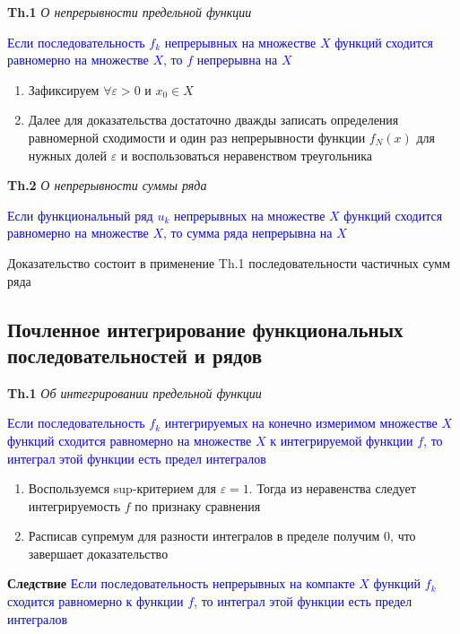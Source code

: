 \textbf{Th.1} \textit{О непрерывности предельной функции}

\textcolor{blue}{Если последовательность $f_k$ непрерывных на множестве $X$ функций сходится равномерно на
множестве $X$, то $f$ непрерывна на $X$}

\begin{enumerate}
    \item Зафиксируем $\forall \varepsilon > 0$ и $x_0 \in X$
    \item Далее для доказательства достаточно дважды записать определения равномерной сходимости и
    один раз непрерывности функции $f_N (x)$ для нужных долей  $\varepsilon$ и воспользоваться неравенством
    треугольника
\end{enumerate}

\textbf{Th.2} \textit{О непрерывности суммы ряда}

\textcolor{blue}{Если функциональный ряд $u_k$ непрерывных на множестве $X$ функций сходится
равномерно на множестве $X$, то сумма ряда непрерывна на $X$}

Доказательство состоит в применение Th.1 последовательности частичных сумм ряда

\subsection{Почленное интегрирование функциональных последовательностей и рядов}

\textbf{Th.1} \textit{Об интегрировании предельной функции}

\textcolor{blue}{Если последовательность $f_k$ интегрируемых на конечно измеримом множестве $X$ функций сходится
равномерно на множестве $X$ к интегрируемой функции $f$, то интеграл этой функции есть предел интегралов}

\begin{enumerate}
    \item Воспользуемся sup-критерием для $\varepsilon = 1$.
    Тогда из неравенства следует интегрируемость $f$ по признаку сравнения
    \item Расписав супремум для разности интегралов в пределе получим 0, что завершает доказательство
\end{enumerate}

\textbf{Следствие} \textcolor{blue}{Если последовательность непрерывных на компакте $X$ функций $f_k$ сходится
равномерно к функции $f$, то интеграл этой функции есть предел интегралов} \\


